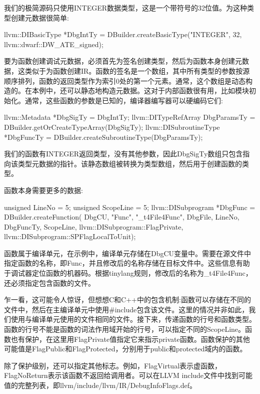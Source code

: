 我们的极简源码只使用INTEGER数据类型，这是一个带符号的32位值。为这种类型创建元数据很简单:

\begin{cpp}
llvm::DIBasicType *DbgIntTy =
    DBuilder.createBasicType("INTEGER", 32,
        llvm::dwarf::DW_ATE_signed);
\end{cpp}

要为函数创建调试元数据，必须首先为签名创建类型，然后为函数本身创建元数据，这类似于为函数创建IR。函数的签名是一个数组，其中所有类型的参数按源顺序排列，函数的返回类型作为索引0处的第一个元素。通常，这个数组是动态构造的。在本例中，还可以静态地构造元数据。这对于内部函数很有用，比如模块初始化。通常，这些函数的参数是已知的，编译器编写器可以硬编码它们:

\begin{cpp}
llvm::Metadata *DbgSigTy = {DbgIntTy};
llvm::DITypeRefArray DbgParamsTy =
            DBuilder.getOrCreateTypeArray(DbgSigTy);
llvm::DISubroutineType *DbgFuncTy =
            DBuilder.createSubroutineType(DbgParamsTy);
\end{cpp}

我们的函数有INTEGER返回类型，没有其他参数，因此DbgSigTy数组只包含指向该类型元数据的指针。该静态数组被转换为类型数组，然后用于创建函数的类型。

函数本身需要更多的数据:

\begin{cpp}
unsigned LineNo = 5;
unsigned ScopeLine = 5;
llvm::DISubprogram *DbgFunc = DBuilder.createFunction(
    DbgCU, "Func", "_t4File4Func", DbgFile, LineNo,
    DbgFuncTy, ScopeLine, llvm::DISubprogram::FlagPrivate,
    llvm::DISubprogram::SPFlagLocalToUnit);
\end{cpp}

函数属于编译单元，在示例中，编译单元存储在DbgCU变量中。需要在源文件中指定函数的名称，即Func，并且修改后的名称存储在目标文件中。这些信息有助于调试器定位函数的机器码。根据tinylang规则，修改后的名称为\_t4File4Func，还必须指定包含函数的文件。

乍一看，这可能令人惊讶，但想想C和C++中的包含机制:函数可以存储在不同的文件中，然后在主编译单元中使用\#include包含该文件。这里的情况并非如此，我们使用与编译单元使用的文件相同的文件。接下来，传递函数的行号和函数类型。函数的行号不能是函数的词法作用域开始的行号，可以指定不同的ScopeLine。函数也有保护，在这里用FlagPrivate值指定它来指示private函数。函数保护的其他可能值是FlagPublic和FlagProtected，分别用于public和protected域内的函数。

除了保护级别，还可以指定其他标志。例如，FlagVirtual表示虚函数，FlagNoReturn表示该函数不返回给调用者。可以在LLVM include文件中找到可能值的完整列表，即llvm/include/llvm/IR/DebugInfoFlags.def。

